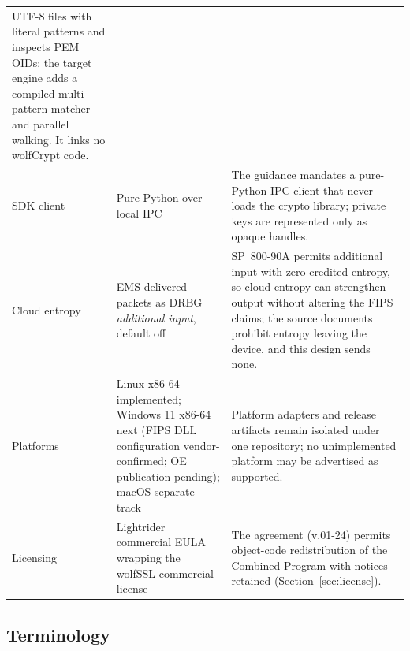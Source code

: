 \documentclass[10pt]{article}
\begin{document}
\begin{small}
\begin{tabularx}{\textwidth}{@{}l>{\raggedright\arraybackslash}p{}L@{}}
  UTF-8 files with literal patterns and inspects PEM OIDs; the target engine adds a
  compiled multi-pattern matcher and parallel walking. It links no wolfCrypt code. \\
SDK client & Pure Python over local IPC & The guidance mandates a pure-Python IPC client
  that never loads the crypto library; private keys are represented only as opaque
  handles. \\
Cloud entropy & EMS-delivered packets as DRBG \emph{additional input}, default off &
  SP~800-90A permits additional input with zero credited entropy, so cloud entropy can
  strengthen output without altering the FIPS claims; the source documents prohibit
  entropy leaving the device, and this design sends none. \\
Platforms & Linux x86-64 implemented; Windows 11 x86-64 next (FIPS DLL configuration
  vendor-confirmed; OE publication pending); macOS separate track &
  Platform adapters and release artifacts remain isolated under one repository; no
  unimplemented platform may be advertised as supported. \\
Licensing & Lightrider commercial EULA wrapping the wolfSSL commercial license & The
  agreement (v.01-24) permits object-code redistribution of the Combined Program with
  notices retained (Section~\ref{sec:license}). \\
\bottomrule
\end{tabularx}
\end{small}

\subsection*{Terminology}
\end{document}
